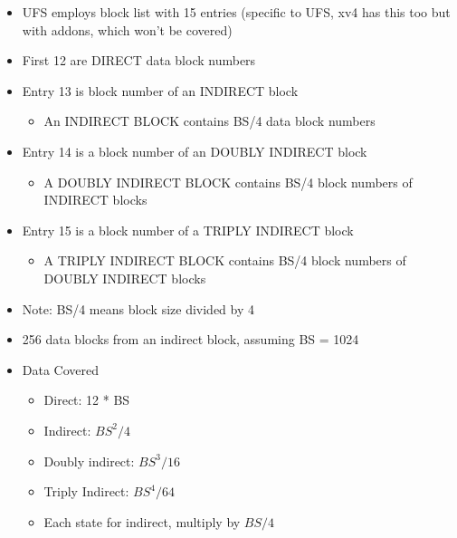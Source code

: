 \begin{itemize}
    \item UFS employs block list with 15 entries (specific to UFS, xv4 has this too but with addons, which won't be covered)
    \item First 12 are DIRECT data block numbers
    \item Entry 13 is block number of an INDIRECT block
    \begin{itemize}
        \item An INDIRECT BLOCK contains BS/4 data block numbers
    \end{itemize}
    \item Entry 14 is a block number of an DOUBLY INDIRECT block
    \begin{itemize}
        \item A DOUBLY INDIRECT BLOCK contains BS/4 block numbers of INDIRECT blocks
    \end{itemize}
    \item Entry 15 is a block number of a TRIPLY INDIRECT block
    \begin{itemize}
        \item A TRIPLY INDIRECT BLOCK contains BS/4 block numbers of DOUBLY INDIRECT blocks
    \end{itemize}
    \item Note: BS/4 means block size divided by 4
    \item 256 data blocks from an indirect block, assuming BS = 1024
    \item Data Covered
    \begin{itemize}
        \item Direct: 12 * BS
        \item Indirect: $BS^2 / 4$
        \item Doubly indirect: $BS^3 / 16$
        \item Triply Indirect: $BS^4 / 64$
        \item Each state for indirect, multiply by $BS/4$
    \end{itemize}
\end{itemize}
